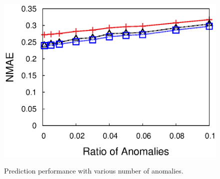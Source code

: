 \begin{figure}[h!]
{{    \includegraphics[width=\figurewidthI]{fig/pred.NumAnomaly.srmf_based_pred.tm_telos_rssi.txt.1000.16.1.1000.r4.period1.org.2d.elem.half.elem1.lr0.2.burst1.anom0.4.noise0.thresh0.eps}
  }
  }
  \caption{Prediction performance with various number of anomalies.}
  \label{fig:anomaly-number-prediction}
\end{figure}



